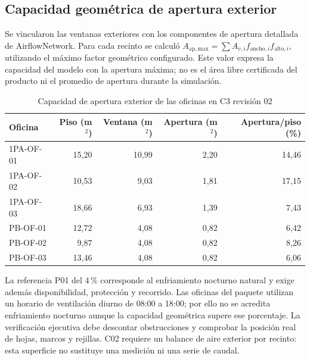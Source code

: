 \subsection{Capacidad geométrica de apertura exterior}
Se vincularon las ventanas exteriores con los componentes de apertura detallada de AirflowNetwork. Para cada recinto se calculó $A_{\mathrm{ap,max}}=\sum A_{v,i} f_{\mathrm{ancho},i}f_{\mathrm{alto},i}$, utilizando el máximo factor geométrico configurado. Este valor expresa la capacidad del modelo con la apertura máxima; no es el área libre certificada del producto ni el promedio de apertura durante la simulación.
\begin{table}[htbp]\centering
\caption{Capacidad de apertura exterior de las oficinas en C3 revisión 02}
{\small\singlespacing\begin{tabular}{lrrrr}\toprule
Oficina & Piso (m$^2$) & Ventana (m$^2$) & Apertura (m$^2$) & Apertura/piso (\%) \\ \midrule
1PA-OF-01 & 15,20 & 10,99 & 2,20 & 14,46 \\
1PA-OF-02 & 10,53 & 9,03 & 1,81 & 17,15 \\
1PA-OF-03 & 18,66 & 6,93 & 1,39 & 7,43 \\
PB-OF-01 & 12,72 & 4,08 & 0,82 & 6,42 \\
PB-OF-02 & 9,87 & 4,08 & 0,82 & 8,26 \\
PB-OF-03 & 13,46 & 4,08 & 0,82 & 6,06 \\
\bottomrule\end{tabular}}
\end{table}
La referencia P01 del 4\,\% corresponde al enfriamiento nocturno natural y exige además disponibilidad, protección y recorrido. Las oficinas del paquete utilizan un horario de ventilación diurno de 08:00 a 18:00; por ello no se acredita enfriamiento nocturno aunque la capacidad geométrica supere ese porcentaje. La verificación ejecutiva debe descontar obstrucciones y comprobar la posición real de hojas, marcos y rejillas. C02 requiere un balance de aire exterior por recinto: esta superficie no sustituye una medición ni una serie de caudal.
